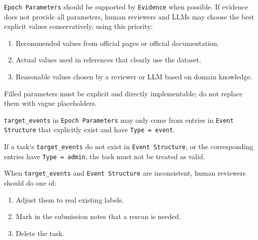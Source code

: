 \begin{tcolorbox}
\smallskip{}\par\smallskip

\noindent \texttt{Epoch Parameters} should be supported by \texttt{Evidence} when possible. If evidence does not provide all parameters, human reviewers and LLMs may choose the best explicit values conservatively, using this priority:\par\smallskip

\begin{enumerate}[leftmargin=1.5em,noitemsep,topsep=2pt]
\item Recommended values from official pages or official documentation.
\item Actual values used in references that clearly use the dataset.
\item Reasonable values chosen by a reviewer or LLM based on domain knowledge.
\end{enumerate}

\noindent Filled parameters must be explicit and directly implementable; do not replace them with vague placeholders.\par\smallskip

\smallskip{}\par\smallskip

\noindent \texttt{target\_events} in \texttt{Epoch Parameters} may only come from entries in \texttt{Event Structure} that explicitly exist and have \texttt{Type = event}.\par\smallskip

\smallskip{}\par\smallskip

\noindent If a task`s \texttt{target\_events} do not exist in \texttt{Event Structure}, or the corresponding entries have \texttt{Type = admin}, the task must not be treated as valid.\par\smallskip

\smallskip{}\par\smallskip

\noindent When \texttt{target\_events} and \texttt{Event Structure} are inconsistent, human reviewers should do one of:\par\smallskip

\begin{enumerate}[leftmargin=1.5em,noitemsep,topsep=2pt]
\item Adjust them to real existing labels.
\item Mark in the submission notes that a rescan is needed.
\item Delete the task.
\end{enumerate}


\end{tcolorbox}
